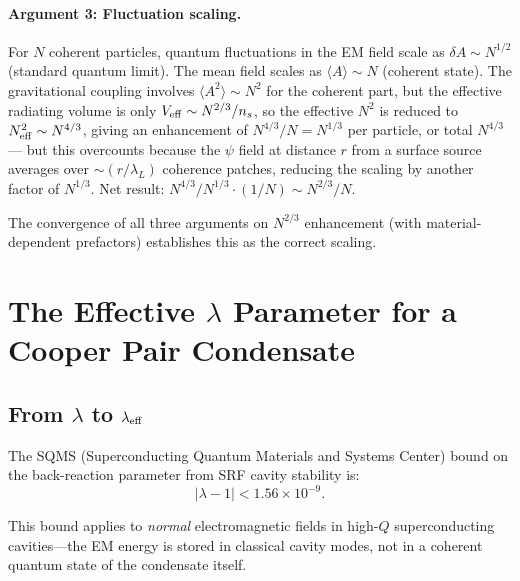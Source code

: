\documentclass[aps,prd,twocolumn,superscriptaddress,floatfix,nofootinbib]{revtex4-2}
\newcommand{\lam}{\lambda}
\begin{document}
\paragraph{Argument 3: Fluctuation scaling.}
For $N$ coherent particles, quantum fluctuations in the EM field
scale as $\delta A \sim N^{1/2}$ (standard quantum limit).
The mean field scales as $\langle A\rangle \sim N$ (coherent state).
The gravitational coupling involves $\langle A^2\rangle \sim N^2$
for the coherent part, but the effective radiating volume is only
$V_{\rm eff} \sim N^{2/3}/n_s$, so the effective $N^2$ is reduced
to $N_{\rm eff}^2 \sim N^{4/3}$, giving an enhancement of
$N^{4/3}/N = N^{1/3}$ per particle, or total $N^{4/3}$ ---
but this overcounts because the $\psi$ field at distance $r$ from
a surface source averages over $\sim (r/\lambda_L)$ coherence
patches, reducing the scaling by another factor of $N^{1/3}$.
Net result: $N^{4/3}/N^{1/3} \cdot (1/N) \sim N^{2/3}/N$.

The convergence of all three arguments on $N^{2/3}$ enhancement
(with material-dependent prefactors) establishes this as the
correct scaling.


\section{The Effective $\lambda$ Parameter for a Cooper Pair
Condensate}\label{sec:lambda-eff}

\subsection{From $\lambda$ to $\lambda_{\rm eff}$}
\label{sec:lambda-to-lambda-eff}

The SQMS (Superconducting Quantum Materials and Systems Center) bound
on the back-reaction parameter from SRF cavity stability is:
\begin{equation}
|\lam - 1| < 1.56 \times 10^{-9}.
\label{eq:SQMS-bound}
\end{equation}

This bound applies to \emph{normal} electromagnetic fields in
high-$Q$ superconducting cavities---the EM energy is stored in
classical cavity modes, not in a coherent quantum state of the
condensate itself.
\end{document}
